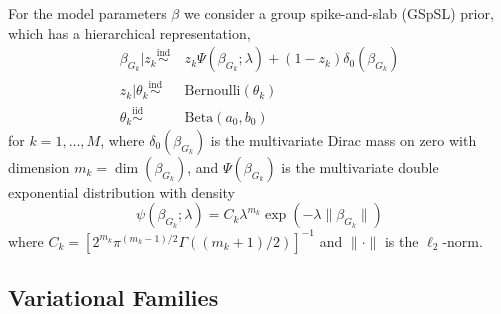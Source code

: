 \documentclass[12pt]{article}
\begin{document}
For the model parameters $\beta$ we consider a group spike-and-slab (GSpSL) prior, which has a hierarchical representation,
\begin{equation}
\begin{aligned}
    \beta_{G_k} | z_k \overset{\text{ind}}{\sim} &\ z_k \Psi(\beta_{G_k}; \lambda) + (1-z_k) \delta_0(\beta_{G_k}) \\
    z_k | \theta_k \overset{\text{ind}}{\sim} &\ \text{Bernoulli}(\theta_k) \\
    \theta_k \overset{\text{iid}}{\sim} &\ \text{Beta}(a_0, b_0)
\end{aligned}
\end{equation}
for $k=1,\dots,M$, where $\delta_0(\beta_{G_k})$ is the multivariate Dirac mass on zero with dimension $m_k = \dim(\beta_{G_k})$, and $\Psi(\beta_{G_k})$ is the multivariate double exponential distribution with density
\begin{equation} \label{eq:density_mvde}
    \psi(\beta_{G_k}; \lambda) = C_k \lambda^{m_k} \exp \left( - \lambda \| \beta_{G_k} \| \right)
\end{equation}
where $ C_k = \left[ 2^{m_k} \pi^{(m_k -1)/2} \Gamma \left( (m_k + 1) /2 \right) \right]^{-1} $ and $ \| \cdot \| $ is the $\ell_2$-norm.


\subsection*{Variational Families}
\end{document}

